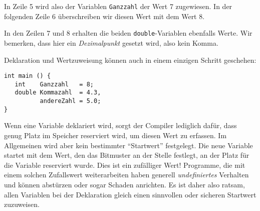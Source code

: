 In Zeile 5 wird also der Variablen \texttt{Ganzzahl} der Wert 7 zugewiesen. In der folgenden Zeile 6 überschreiben wir diesen Wert mit dem Wert 8.

In den Zeilen 7 und 8 erhalten die beiden \texttt{double}-Variablen ebenfalls Werte. Wir bemerken, dass hier ein \emph{Dezimalpunkt} gesetzt wird, also kein Komma.

Deklaration und Wertzuweisung können auch in einem einzigen Schritt geschehen:
\begin{codebox}
\begin{verbatim}
int main () {
   int    Ganzzahl   = 8;
   double Kommazahl  = 4.3,
          andereZahl = 5.0;
}
\end{verbatim}
\end{codebox}

\begin{hintbox}
Wenn eine Variable deklariert wird, sorgt der Compiler lediglich dafür, dass genug Platz im Speicher reserviert wird, um diesen Wert zu erfassen. Im Allgemeinen wird aber kein bestimmter \enquote{Startwert} festgelegt. Die neue Variable startet mit dem Wert, den das Bitmuster an der Stelle festlegt, an der Platz für die Variable reserviert wurde. Dies ist ein zufälliger Wert! Programme, die mit einem solchen Zufallswert weiterarbeiten haben generell \emph{undefiniertes} Verhalten und können abstürzen oder sogar Schaden anrichten. Es ist daher also ratsam, allen Variablen bei der Deklaration gleich einen sinnvollen oder sicheren Startwert zuzuweisen.
\end{hintbox}

